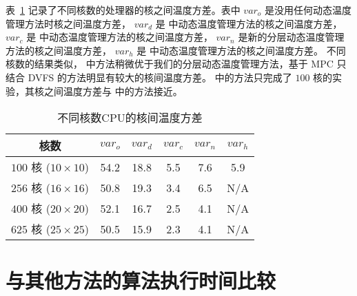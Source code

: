 表~\ref{tab:var} 记录了不同核数的处理器的核之间温度方差。表中 $var_o$ 是没用任何动态温度管理方法时核之间温度方差，
$var_d$ 是 \cite{Zanini:ECCTD'09} 中动态温度管理方法的核之间温度方差，
$var_c$ 是 \cite{MaWang:APCCAS'14} 中动态温度管理方法的核之间温度方差，
$var_n$ 是新的分层动态温度管理方法的核之间温度方差，
$var_h$ 是 \cite{Hanumaiah:TCAD'11} 中动态温度管理方法的核之间温度方差。
不同核数的结果类似， \cite{MaWang:APCCAS'14} 中方法稍微优于我们的分层动态温度管理方法，基于 MPC 只结合 DVFS 的方法明显有较大的核间温度方差。
\cite{Hanumaiah:TCAD'11} 中的方法只完成了 $100$ 核的实验，其核之间温度方差与 \cite{MaWang:APCCAS'14} 中的方法接近。\\
\begin{table}[H]
\centering
 \caption{不同核数CPU的核间温度方差 \label{tab:var}}{
 \begin{tabular}{|c|c|c|c|c|c|}
 \hline
 \hline
 核数  & $var_o$ & $var_d$ & $var_c$ & $var_n$ & $var_h$ \\
 \hline 
 \hline
 $100$ 核 ($10 \times 10$) & 54.2 & 18.8 & 5.5 & 7.6 & 5.9\\

 \hline
 $256$ 核 ($16 \times 16$) & 50.8 & 19.3 & 3.4 & 6.5 & N/A\\
 \hline
 $400$ 核 ($20 \times 20$) & 52.1 & 16.7 & 2.5 & 4.1 & N/A\\
 \hline
 $625$ 核 ($25 \times 25$) & 50.5 & 15.9 & 2.3 & 4.1 & N/A\\
 \hline
 \hline
 \end{tabular}}
 \end{table}
 
 \section{与其他方法的算法执行时间比较}\label{sec:time_comp}
 
